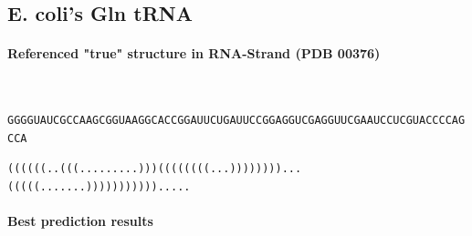 \documentclass{article}
\begin{document}
\subsection{E. coli's Gln tRNA}

\paragraph{Referenced "true" structure in RNA-Strand (PDB 00376)} ~ 

\texttt{GGGGUAUCGCCAAGCGGUAAGGCACCGGAUUCUGAUUCCGGAGGUCGAGGUUCGAAUCCUCGUACCCCAGCCA}

\texttt{((((((..(((.........)))((((((((...))))))))...(((((.......))))))))))).....}

\paragraph{Best prediction results} ~ 
\end{document}
